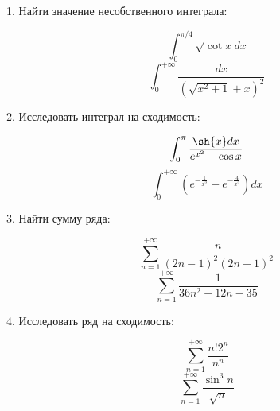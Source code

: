 \documentclass[a4paper]{report}
\begin{document}
1. Найти значение несобственного интеграла:

$$\int_{0}^{\pi/4} \sqrt{\cot{x}} dx$$
$$\int_{0}^{+\infty} \frac{dx}{(\sqrt{x^2 + 1} + x)^2}$$

2. Исследовать интеграл на сходимость:

$$\int_{0}^{\pi} \frac{\sh{x}dx}{e^{x^2} - \cos{x}}$$
$$\int_{0}^{+\infty} \left(e^{-\frac{1}{x^2}} - e^{-\frac{4}{x^2}} \right) dx$$

3. Найти сумму ряда:

$$\sum_{n=1}^{+\infty} \frac{n}{(2n-1)^2(2n + 1)^2}$$
$$\sum_{n=1}^{+\infty} \frac{1}{36n^2 + 12n -35}$$

4. Исследовать ряд на сходимость:

$$\sum_{n=1}^{+\infty} \frac{n!2^n}{n^n}$$
$$\sum_{n=1}^{+\infty} \frac{\sin^3{n}}{\sqrt{n}}$$
\end{document}
